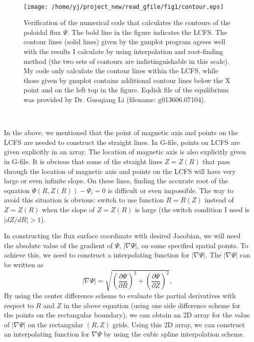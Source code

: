 \documentclass{article}
\begin{document}
\

\begin{figure}[h]
  \texttt{[image: /home/yj/project\_new/read\_gfile/fig1/contour.eps]}
  \caption{\label{4-3-p2}Verification of the numerical code that calculates
  the contours of the poloidal flux $\Psi$. The bold line in the figure
  indicates the LCFS. The contour lines (solid lines) given by the gnuplot
  program agrees well with the results I calculate by using interpolation and
  root-finding method (the two sets of contours are indistinguishable in this
  scale). My code only calculate the contour lines within the LCFS, while
  those given by gnuplot contains additional contour lines below the X point
  and on the left top in the figure. Eqdisk file of the equilibrium was
  provided by Dr. Guoqiang Li (filename: g013606.07104).}
\end{figure}

\

In the above, we mentioned that the point of magnetic axis and points on the
LCFS are needed to construct the straight lines. In G-file, points on LCFS are
given explicitly in an array. The location of magnetic axis is also explicitly
given in G-file. It is obvious that some of the straight lines $Z = Z (R)$
that pass through the location of magnetic axis and points on the LCFS will
have very large or even infinite slope. On these lines, finding the accurate
root of the equation $\Psi (R, Z (R)) - \Psi_i = 0$ is difficult or even
impossible. The way to avoid this situation is obvious: switch to use function
$R = R (Z)$ instead of $Z = Z (R)$ when the slope of $Z = Z (R)$ is large (the
switch condition I used is $|d Z / d R| > 1$).

In constructing the flux surface coordinate with desired Jacobian, we will
need the absolute value of the gradient of $\Psi$, $| \nabla \Psi |$, on some
specified spatial points. To achieve this, we need to construct a
interpolating function for $| \nabla \Psi |$. The $| \nabla \Psi |$ can be
written as
\begin{equation}
  | \nabla \Psi | = \sqrt{\left( \frac{\partial \Psi}{\partial R} \right)^2 +
  \left( \frac{\partial \Psi}{\partial Z} \right)^2},
\end{equation}
By using the center difference scheme to evaluate the partial derivatives with
respect to $R$ and $Z$ in the above equation (using one side difference scheme
for the points on the rectangular boundary), we can obtain an 2D array for the
value of $| \nabla \Psi |$ on the rectangular $(R, Z)$ grids. Using this 2D
array, we can construct an interpolating function for $\nabla \Psi$ by using
the cubic spline interpolation scheme.
\end{document}
